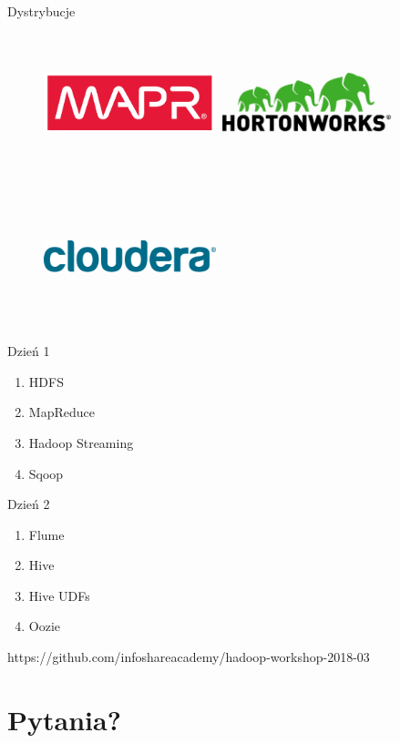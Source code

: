 \documentclass{beamer}
\begin{document}
\begin{frame}{Dystrybucje}
	\begin{multicols}{2}
		\begin{figure}
			\includegraphics[width=5cm,height=4cm,keepaspectratio=true]{distributions/mapr}
			\includegraphics[width=5cm,height=4cm,keepaspectratio=true]{distributions/hortonworks}
		\end{figure}
	\end{multicols}
	\begin{figure}
		\includegraphics[width=5cm,height=4cm,keepaspectratio=true]{distributions/cloudera}
	\end{figure}
\end{frame}


\begin{frame}{Dzień 1}
	\begin{enumerate}
		\item HDFS
		\item MapReduce
		\item Hadoop Streaming
		\item Sqoop
	\end{enumerate}
\end{frame}
\begin{frame}{Dzień 2}
	\begin{enumerate}
		\item Flume
		\item Hive
		\item Hive UDFs
		\item Oozie
	\end{enumerate}
\end{frame}

\begin{frame}
	\begin{center}
		https://github.com/infoshareacademy/hadoop-workshop-2018-03
	\end{center}
\end{frame}

\section{Pytania?}
\end{document}
